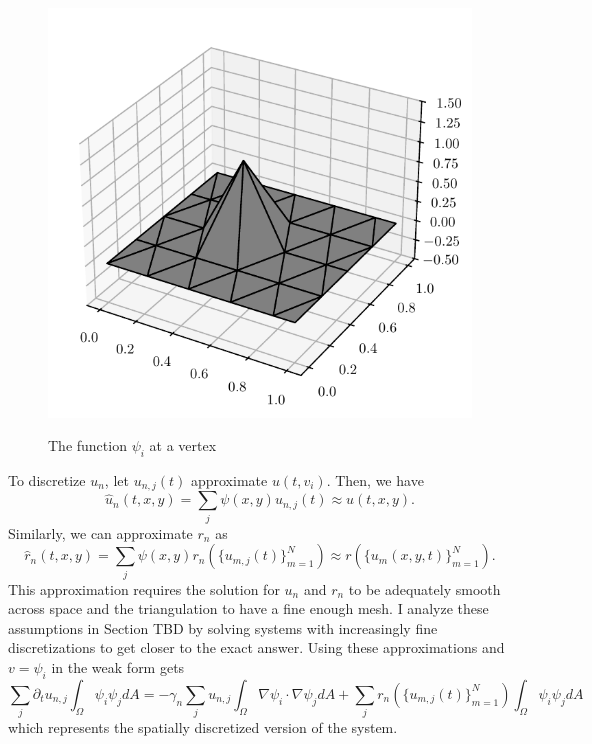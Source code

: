 \begin{figure}[t!]
    \centering
    \caption{The function $\psi_i$ at a vertex}
    \includegraphics{figures/psi.pdf}
    \label{fig:psi}
\end{figure}

To discretize $u_n$, let $u_{n, j} (t)$ approximate $u(t, v_i)$. Then, we have
\[
    \hat{u}_n (t, x, y) = \sum_j \psi(x, y) u_{n, j} (t) \approx u(t, x, y).
\]
Similarly, we can approximate $r_n$ as
\[
    \hat{r}_n (t, x, y) = \sum_j \psi(x, y) r_n \left(\{u_{m, j} (t)\}_{m = 1}^N\right) \approx r(\{u_{m} (x, y, t)\}_{m = 1}^N).
\]
This approximation requires the solution for $u_n$ and $r_n$ to be adequately smooth across space and the triangulation to have a fine enough mesh. I analyze these assumptions in Section TBD by solving systems with increasingly fine discretizations to get closer to the exact answer. Using these approximations and $v = \psi_i$ in the weak form gets
\[
    \sum_j \partial_t u_{n, j} \int_\Omega \psi_i \psi_j dA = -\gamma_n \sum_j u_{n, j} \int_\Omega \nabla \psi_i \cdot \nabla \psi_j dA + \sum_j r_n \left(\{u_{m, j} (t)\}_{m = 1}^N\right) \int_\Omega \psi_i \psi_j dA
\]
which represents the spatially discretized version of the system.

